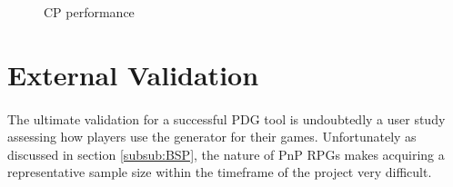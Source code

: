 \documentclass{UoYCSproject}
\begin{document}

    \begin{figure}
      \centering
      \caption{CP performance}
  \end{figure}


\section{External Validation} %
\paragraph{}
The ultimate validation for a successful PDG tool is undoubtedly a user study assessing how players use the generator for their games. Unfortunately as discussed in section \ref{subsub:BSP}, the nature of PnP RPGs makes acquiring a representative sample size within the timeframe of the project very difficult. 
\end{document}
